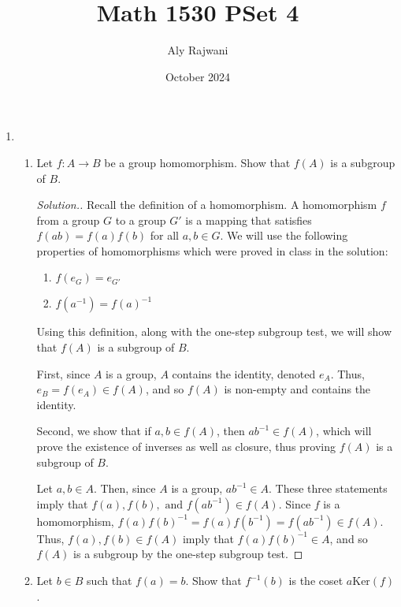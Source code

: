 \documentclass{article}
\title{Math 1530 PSet 4}
\author{Aly Rajwani}
\date{October 2024}
\newcommand{\sk}{\smallskip}
\begin{document}
\maketitle

\begin{enumerate}
    \item \begin{enumerate}
        \item Let $f: A \rightarrow B$ be a group homomorphism. Show that $f(A)$ is a subgroup of $B$.
        \begin{proof}[Solution.]
        
        Recall the definition of a homomorphism. A homomorphism $f$ from a group $G$ to a group $G'$ is a mapping that satisfies $f(ab) = f(a)f(b)$ for all $a, b \in G$. We will use the following properties of homomorphisms which were proved in class in the solution:
        
            \begin{enumerate}
                \item $f(e_G) = e_{G'}$
                \item $f(a^{-1}) = f(a)^{-1}$
            \end{enumerate}

        \sk

        Using this definition, along with the one-step subgroup test, we will show that $f(A)$ is a subgroup of $B$. 

        \sk

        First, since $A$ is a group, $A$ contains the identity, denoted $e_A$. Thus, $e_B = f(e_A) \in f(A)$, and so $f(A)$ is non-empty and contains the identity. 

        \sk

        Second, we show that if $a, b \in f(A)$, then $ab^{-1} \in f(A)$, which will prove the existence of inverses as well as closure, thus proving $f(A)$ is a subgroup of $B$.

        \sk

        Let $a, b \in A$. Then, since $A$ is a group, $ab^{-1} \in A$. These three statements imply that $f(a), f(b), \text{ and } f(ab^{-1}) \in f(A)$. Since $f$ is a homomorphism, $f(a)f(b)^{-1} = f(a)f(b^{-1}) = f(ab^{-1}) \in f(A)$. Thus, $f(a), f(b) \in f(A)$ imply that $f(a)f(b)^{-1} \in A$, and so $f(A)$ is a subgroup by the one-step subgroup test.
        \end{proof}
        

        \item Let $b \in B$ such that $f(a) = b$. Show that $f^{-1}(b)$ is the coset $a\text{Ker}(f)$.


\end{enumerate}
\end{enumerate}
\end{document}
